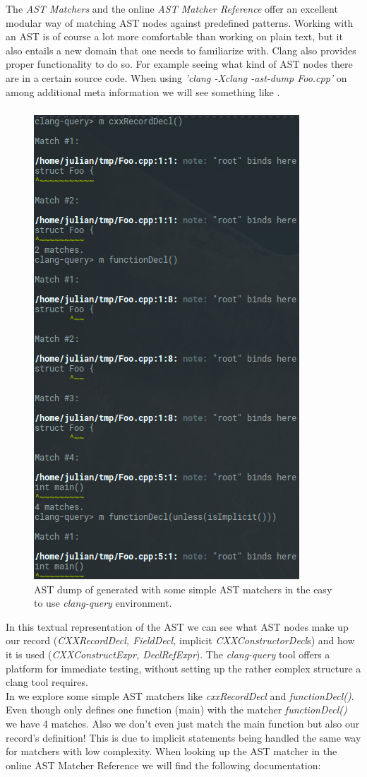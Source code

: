 The \textit{AST Matchers} and the online \textit{AST Matcher Reference} offer an excellent modular way of matching AST nodes against predefined patterns. Working with an AST is of course a lot more comfortable than working on plain text, but it also entails a new domain that one needs to familiarize with. Clang also provides proper functionality to do so. For example seeing what kind of AST nodes there are in a certain source code. When using \textit{'clang -Xclang -ast-dump Foo.cpp'} on  among additional meta information we will see something like . 
\subsubsection{}
\begin{figure}
	\centering
	\vspace{-20pt}
	\includegraphics[width=\linewidth, height=0.7\textwidth]{PICs/clang_query_foo_code}
	\caption{AST dump of  generated with some simple AST matchers in the easy to use \textit{clang-query} environment.}\label{foo_code_clang_query}
\end{figure}In this textual representation of the AST we can see what AST nodes make up our record (\textit{CXXRecordDecl, FieldDecl,} implicit \textit{CXXConstructorDecl}s) and how it is used (\textit{CXXConstructExpr, DeclRefExpr}). The \textit{clang-query} tool  offers a platform for immediate testing, without setting up the rather complex structure a clang tool requires.\\
In  we explore some simple AST matchers like \textit{cxxRecordDecl} and \textit{functionDecl()}. Even though  only defines one function (main) with the matcher \textit{functionDecl()} we have 4 matches. Also we don't even just match the main function but also our record's definition! This is due to implicit statements being handled the same way for matchers with low complexity. When looking up the AST matcher in the online AST Matcher Reference we will find the following documentation:\newline
